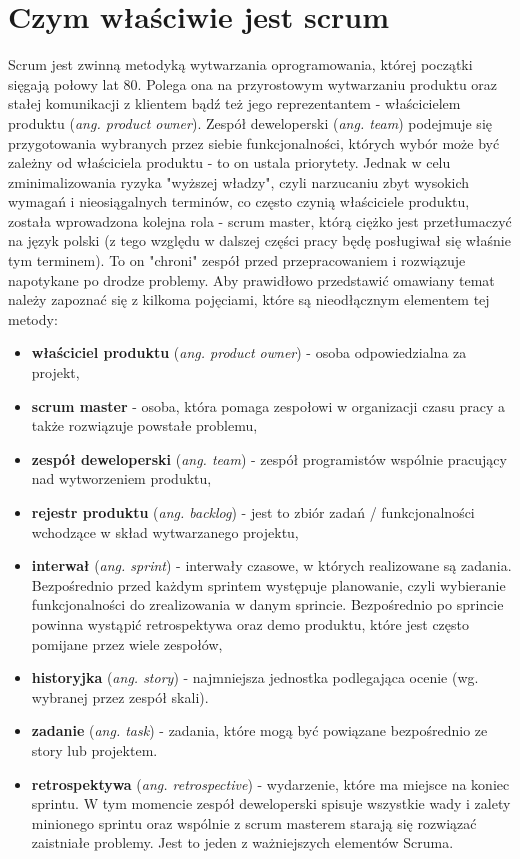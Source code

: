 \section{Czym właściwie jest scrum}
Scrum jest zwinną metodyką wytwarzania oprogramowania, której początki sięgają połowy lat 80. Polega ona na przyrostowym wytwarzaniu produktu oraz stałej komunikacji z klientem bądź też jego reprezentantem - właścicielem produktu (\textit{ang. product owner}). Zespół deweloperski ({\textit{ang. team}}) podejmuje się przygotowania wybranych przez siebie funkcjonalności, których wybór może być zależny od właściciela produktu - to on ustala priorytety. Jednak w celu zminimalizowania ryzyka "wyższej władzy", czyli narzucaniu zbyt wysokich wymagań i nieosiągalnych terminów, co często czynią właściciele produktu, została wprowadzona kolejna rola - scrum master, którą ciężko jest przetłumaczyć na język polski (z tego względu w dalszej części pracy będę posługiwał się właśnie tym terminem). To on "chroni" zespół przed przepracowaniem i rozwiązuje napotykane po drodze problemy. Aby prawidłowo przedstawić omawiany temat należy zapoznać się z kilkoma pojęciami, które są nieodłącznym elementem tej metody:
\begin{itemize}
	\item \textbf{właściciel produktu} (\textit{ang. product owner}) - osoba odpowiedzialna za projekt,
	\item \textbf{scrum master} - osoba, która pomaga zespołowi w organizacji czasu pracy a także rozwiązuje powstałe problemu,
	\item \textbf{zespół deweloperski} (\textit{ang. team}) - zespół programistów wspólnie pracujący nad wytworzeniem produktu,
	\item \textbf{rejestr produktu} (\textit{ang. backlog}) - jest to zbiór zadań / funkcjonalności wchodzące w skład wytwarzanego projektu,
	\item \textbf{interwał} (\textit{ang. sprint}) - interwały czasowe, w których realizowane są zadania. Bezpośrednio przed każdym sprintem występuje planowanie, czyli wybieranie funkcjonalności do zrealizowania w danym sprincie. Bezpośrednio po sprincie powinna wystąpić retrospektywa oraz demo produktu, które jest często pomijane przez wiele zespołów,
	\item \textbf{historyjka} (\textit{ang. story}) - najmniejsza jednostka podlegająca ocenie (wg. wybranej przez zespół skali). 
	\item \textbf{zadanie} (\textit{ang. task}) - zadania, które mogą być powiązane bezpośrednio ze story lub projektem.
	\item \textbf{retrospektywa} (\textit{ang. retrospective}) - wydarzenie, które ma miejsce na koniec sprintu. W tym momencie zespół deweloperski spisuje wszystkie wady i zalety minionego sprintu oraz wspólnie z scrum masterem starają się rozwiązać zaistniałe problemy. Jest to jeden z ważniejszych elementów Scruma.
\end{itemize} 

